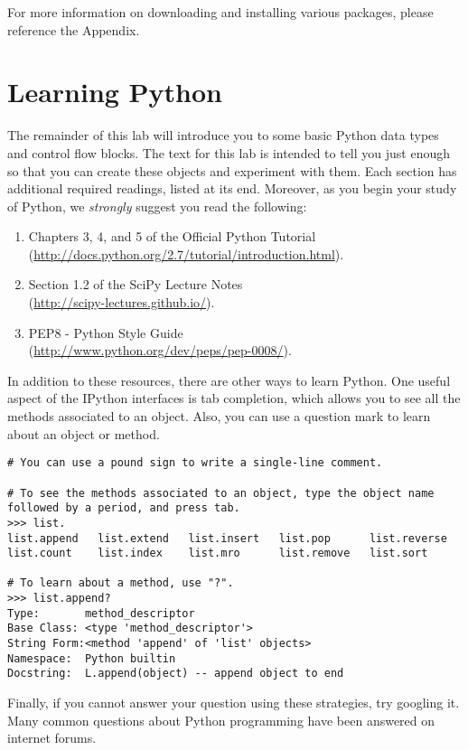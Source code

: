For more information on downloading and installing various packages, please 
reference the Appendix.


\section*{Learning Python}
The remainder of this lab will introduce you to some basic Python data types and control flow blocks. The text for this lab is intended to tell you just enough so that you can create these objects and experiment with them. Each section has additional required readings, listed at its end. Moreover, as you begin your study of Python, we \emph{strongly} suggest you read the following:
\begin{enumerate}
\item Chapters 3, 4, and 5 of the Official Python Tutorial \\
        (\url{http://docs.python.org/2.7/tutorial/introduction.html}).
\item Section 1.2 of the SciPy Lecture Notes\\
        (\url{http://scipy-lectures.github.io/}).
\item PEP8 - Python Style Guide \\
        (\url{http://www.python.org/dev/peps/pep-0008/}).
\end{enumerate}

In addition to these resources, there are other ways to learn Python. One useful aspect of the IPython interfaces is tab completion, which allows you to see all the methods associated to an object. Also, you can use a question mark to learn about an object or method.

\begin{lstlisting}
# You can use a pound sign to write a single-line comment.

# To see the methods associated to an object, type the object name followed by a period, and press tab.
>>> list.
list.append   list.extend   list.insert   list.pop      list.reverse  
list.count    list.index    list.mro      list.remove   list.sort

# To learn about a method, use "?".
>>> list.append?
Type:       method_descriptor
Base Class: <type 'method_descriptor'>
String Form:<method 'append' of 'list' objects>
Namespace:  Python builtin
Docstring:  L.append(object) -- append object to end
\end{lstlisting}

Finally, if you cannot answer your question using these strategies, try googling it. Many common questions about Python programming have been answered on internet forums.

